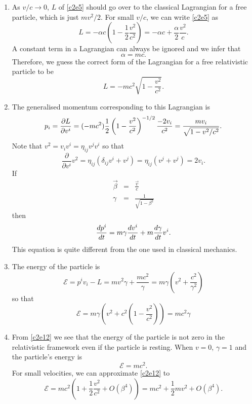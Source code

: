 \begin{enumerate}
\item As $v/c \rightarrow 0$, $L$ of \eqref{c2e5} should go over to the 
classical Lagrangian for a free particle, which is just $mv^2/2$. For small 
$v/c$, we can write \eqref{c2e5} as
\[
L = -\alpha c\left(1 - \frac{1}{2}\frac{v^2}{c^2}\right) = 
-\alpha c + \frac{\alpha}{2}\frac{v^2}{c}.
\]
A constant term in a Lagrangian can always be ignored and we infer that
\begin{equation}\label{c2e6}
\alpha = mc.
\end{equation}
Therefore, we guess the correct form of the Lagrangian for a free relativistic
particle to be
\begin{equation}\label{c2e7}
L = -mc^2\sqrt{1 - \frac{v^2}{c^2}}.
\end{equation}

\item The generalised momentum corresponding to this Lagrangian is
\begin{equation}\label{c2e8}
p_i = \frac{\partial{L}}{\partial{v^i}} = (-mc^2)\frac{1}{2}\left(1 - \frac{v^2}{c^2}\right)^{-1/2}
\frac{-2v_i}{c^2} = \frac{mv_i}{\sqrt{1 - v^2/c^2}}.
\end{equation}
Note that $v^2 = v_iv^i = \eta_{ij}v^jv^i$ so that
\[
\frac{\partial}{\partial v^i}v^2 = \eta_{ij}(\delta_{ij}v^i + v^j) = \eta_{ij}
(v^j + v^j) = 2v_i.
\]
If
\begin{eqnarray}
\vec\beta &=& \frac{\vec{v}}{c} \\ \label{c2e9}
\gamma &=& \frac{1}{\sqrt{1 - \beta^2}} \label{c2e10}
\end{eqnarray}
then
\begin{equation}\label{c2e11}
\frac{d{p^i}}{d{t}} = m\gamma \frac{d{v^i}}{d{t}} + m\frac{d{\gamma}}{d{t}}v^i.
\end{equation}
This equation is quite different from the one used in classical mechanics.

\item The energy of the particle is
\[
\mathcal{E} = p^i v_i - L = mv^2\gamma + \frac{mc^2}{\gamma} = m\gamma\left(v^2 + \frac{c^2}{\gamma^2}\right)
\]
so that
\begin{equation}\label{c2e12}
\mathcal{E} = m\gamma\left(v^2 + c^2\left(1 - \frac{v^2}{c^2}\right)\right) 
= mc^2\gamma
\end{equation}

\item From \eqref{c2e12} we see that the energy of the particle is not zero in
the relativistic framework even if the particle is resting. When $v = 0$, $\gamma
= 1$ and the particle's energy is
\begin{equation}\label{c2e13}
\mathcal{E} = mc^2.
\end{equation}
For small velocities, we can approximate \eqref{c2e12} to
\begin{equation}\label{c2e14}
\mathcal{E} = mc^2\left(1 + \frac{1}{2}\frac{v^2}{c^2} + O(\beta^4)\right) = 
mc^2 + \frac{1}{2}mv^2 + O(\beta^4).
\end{equation}


\end{enumerate}
